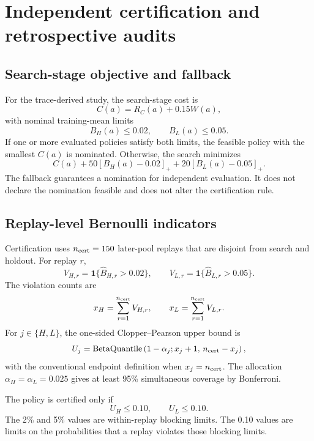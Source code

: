 \documentclass[futureinternet,supfile,submit,moreauthors]{Definitions/mdpi}
\begin{document}
\section{Independent certification and retrospective audits}
\label{sec:certification}

\subsection{Search-stage objective and fallback}

For the trace-derived study, the search-stage cost is
\[
C(a)=R_C(a)+0.15W(a),
\]
with nominal training-mean limits
\[
B_H(a)\leq0.02,
\qquad
B_L(a)\leq0.05.
\]
If one or more evaluated policies satisfy both limits, the feasible policy
with the smallest \(C(a)\) is nominated. Otherwise, the search minimizes
\[
C(a)
+
50[B_H(a)-0.02]_+
+
20[B_L(a)-0.05]_+.
\]
The fallback guarantees a nomination for independent evaluation. It does not
declare the nomination feasible and does not alter the certification rule.

\subsection{Replay-level Bernoulli indicators}

Certification uses \(n_{\rm cert}=150\) later-pool replays that are disjoint
from search and holdout. For replay \(r\),
\[
V_{H,r}
=
\mathbf 1\{\widehat B_{H,r}>0.02\},
\qquad
V_{L,r}
=
\mathbf 1\{\widehat B_{L,r}>0.05\}.
\]
The violation counts are
\[
x_H=\sum_{r=1}^{n_{\rm cert}}V_{H,r},
\qquad
x_L=\sum_{r=1}^{n_{\rm cert}}V_{L,r}.
\]
For \(j\in\{H,L\}\), the one-sided Clopper--Pearson upper bound is
\[
U_j
=
\operatorname{BetaQuantile}
\left(
1-\alpha_j;
x_j+1,\,
n_{\rm cert}-x_j
\right),
\]
with the conventional endpoint definition when \(x_j=n_{\rm cert}\).
The allocation \(\alpha_H=\alpha_L=0.025\) gives at least 95\% simultaneous
coverage by Bonferroni.

The policy is certified only if
\[
U_H\leq0.10,
\qquad
U_L\leq0.10.
\]
The 2\% and 5\% values are within-replay blocking limits. The 0.10 values are
limits on the probabilities that a replay violates those blocking limits.
\end{document}
